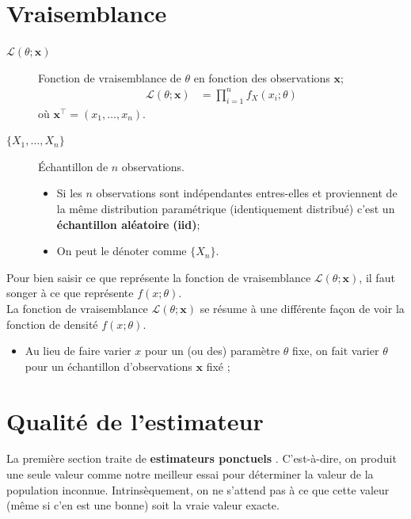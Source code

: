 \documentclass[10pt, french]{article}
\begin{document}
\begin{multicols*}{2}
\columnbreak
\section{Vraisemblance}
\begin{distributions}[Notation]
\begin{description}
	\item[$\mathcal{L}(\theta; \bm{x})$]	Fonction de vraisemblance de $\theta$ en fonction des observations $\bm{x}$;
		\begin{align*}
		\mathcal{L}(\theta; \bm{x})
		&=	\prod_{i	=	1}^{n}	f_{X}(x_{i} ; \theta)
		\end{align*}
		où $\bm{x}^{\top}	=	(x_{1}, \dots, x_{n})$.
	\item[$\{X_{1}, \dots, X_{n}\}$]	Échantillon de $n$ observations.
		\begin{itemize}[leftmargin = *]
		\item	Si les $n$ observations sont indépendantes entres-elles et proviennent de la même distribution paramétrique (identiquement distribué) c'est un \textbf{échantillon aléatoire} \textbf{(iid)};
		\item	On peut le dénoter comme $\{X_{n}\}$.
		\end{itemize}
\end{description}
\end{distributions}

Pour bien saisir ce que représente la fonction de vraisemblance $\mathcal{L}(\theta; \bm{x})$, il faut songer à ce que représente $f(x; \theta)$. \\
La fonction de vraisemblance $\mathcal{L}(\theta; \bm{x})$ se résume à une différente façon de voir la fonction de densité $f(x ; \theta)$. 
\begin{itemize}
	\item	Au lieu de faire varier $x$ pour un (ou des) paramètre $\theta$ fixe, on fait varier $\theta$ pour un échantillon d'observations $\bm{x}$ fixé ; 
\end{itemize}



\columnbreak
\section{Qualité de l'estimateur}

La première section traite de \guillemotleft \textbf{estimateurs ponctuels} \guillemotright. 
C'est-à-dire, on produit une seule valeur comme notre meilleur essai pour déterminer la valeur de la population inconnue.
Intrinsèquement, on ne s'attend pas à ce que cette valeur (même si c'en est une bonne) soit la vraie valeur exacte.\\


\end{multicols*}
\end{document}
